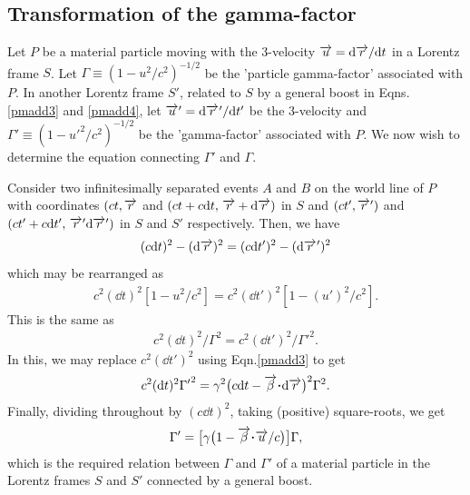 \subsection{Transformation of the gamma-factor} 
Let $P$ be a material particle moving with the 
3-velocity  
$\overrightarrow{u}=\mathrm{d} \overrightarrow{r}/\mathrm{d} t$ in a Lorentz frame $S$. 
Let 
$\Gamma\equiv (1-u^2/c^2)^{-1/2}$ be the 'particle 
gamma-factor' associated with $P$. In another  Lorentz 
frame 
$S'$, related to $S$ by a general boost in Eqns. 
\eqref{pmadd3} and \eqref{pmadd4}, let $\overrightarrow{u}'=\mathrm{d} 
{\overrightarrow{r}\hspace*{.3pt}'}/\mathrm{d} t'$ be the 3-velocity and   
$\Gamma'\equiv 
(1-{u'}^2/c^2)^{-1/2}$ be the 'gamma-factor' 
associated 
with 
$P$. We now wish to determine the equation connecting  
$\Gamma'$ and $\Gamma$.

Consider two infinitesimally separated events $A$ and 
$B$ on the world line of $P$ with coordinates 
$(ct,\overrightarrow{r}$ 
and $(ct+c\mathrm{d} t,\,  \overrightarrow{r}+\mathrm{d} \overrightarrow{r})$ in $S$ and 
$(ct',\overrightarrow{r}')$ and $(ct'+c\mathrm{d} t',\,\overrightarrow{r}'\mathrm{d} 
\overrightarrow{r}')$ 
in 
$S$ and $S'$ respectively. Then, we have
\begin{align}\label{6.9x}
 (c\mathrm{d} t)^2-(\mathrm{d} \overrightarrow{r})^2=(c\mathrm{d} {t'})^2-(\mathrm{d} 
{\overrightarrow{r}\hspace*{.3pt}'})^2
\end{align}
which may be rearranged as
\begin{align}\label{6.10x}
c^2 (\dd t)^2[1-u^2/c^2]=c^2 (\dd t')^2[1-(u')^2/c^2].
\end{align}
This is the same as
\begin{align}\label{6.11x}
c^2  (\dd t)^2/\Gamma^2=c^2 (\dd t')^2/{\Gamma'}^2.
\end{align}
In this, we may replace $c^2(\dd t')^2$ using
Eqn.\eqref{pmadd3} to get
\begin{align}\label{6.12x}
c^2  (\dd t)^2{\Gamma'}^2=\gkg^2\big(c\dd t-\veca{\gkb}
\dotp \dd \veca{r}\big)^2 {\Gamma}^2.
\end{align}
Finally, dividing throughout by $(c\dd t)^2$, taking 
(positive) square-roots, we get
\begin{align}\label{6.13x}
\Gamma'=\big[\gkg\big(1-\veca{\gkb} 
\dotp\veca{u}/c\big)
\big]\Gamma,
\end{align}
which is the required relation between $\Gamma$ and 
$\Gamma'$ of a material particle in the Lorentz frames 
$S$ 
and $S'$ connected by a general boost.

